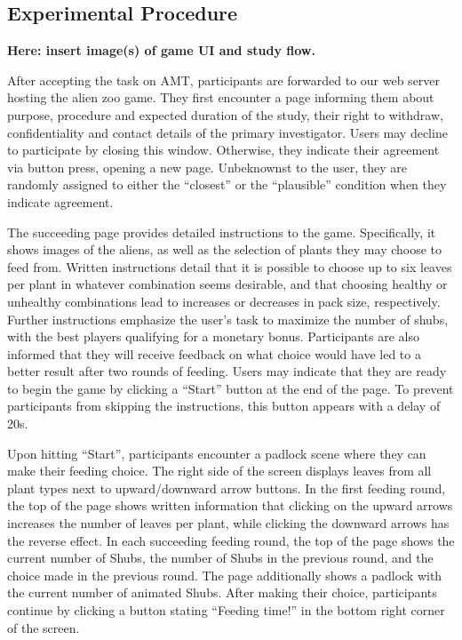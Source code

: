 \subsection{Experimental Procedure}\label{subsec:experimental-procedure}

\textbf{Here: insert image(s) of game UI and study flow.}

After accepting the task on \gls{AMT}, participants are forwarded to our web server hosting the alien zoo game.
They first encounter a page informing them about purpose, procedure and expected duration of the study, their right to withdraw, confidentiality and contact details of the primary investigator.
Users may decline to participate by closing this window.
Otherwise, they indicate their agreement via button press, opening a new page.
Unbeknownst to the user, they are randomly assigned to either the ``closest'' or the ``plausible'' condition when they indicate agreement.

The succeeding page provides detailed instructions to the game. 
Specifically, it shows images of the aliens, as well as the selection of plants they may choose to feed from.
Written instructions detail that it is possible to choose up to six leaves per plant in whatever combination seems desirable, and that choosing healthy or unhealthy combinations lead to increases or decreases in pack size, respectively.
Further instructions emphasize the user's task to maximize the number of shubs, with the best players qualifying for a monetary bonus.
Participants are also informed that they will receive feedback on what choice would have led to a better result after two rounds of feeding.
Users may indicate that they are ready to begin the game by clicking a ``Start'' button at the end of the page.
To prevent participants from skipping the instructions, this button appears with a delay of 20s.

Upon hitting ``Start'', participants encounter a padlock scene where they can make their feeding choice.
The right side of the screen displays leaves from all plant types next to upward/downward arrow buttons. 
In the first feeding round, the top of the page shows written information that clicking on the upward arrows increases the number of leaves per plant, while clicking the downward arrows has the reverse effect.
In each succeeding feeding round, the top of the page shows the current number of Shubs, the number of Shubs in the previous round, and the choice made in the previous round.
The page additionally shows a padlock with the current number of animated Shubs.
After making their choice, participants continue by clicking a button stating ``Feeding time!'' in the bottom right corner of the screen.

